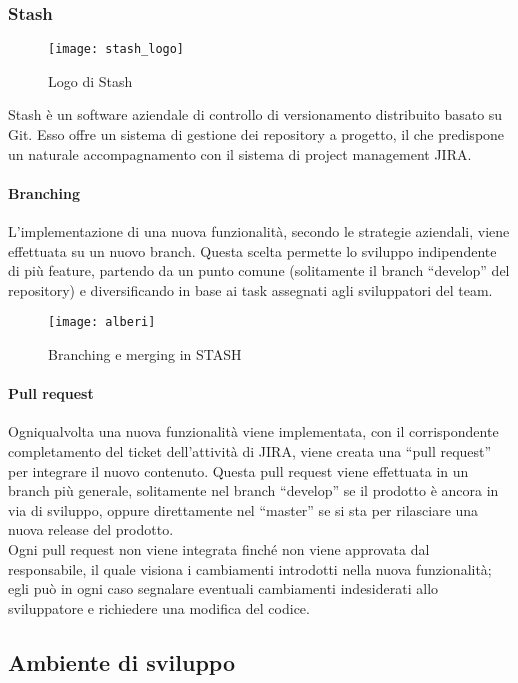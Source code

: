 \subsubsection{Stash}
\begin{figure}[htb] 
    \centering 
    \texttt{[image: stash\_logo]} 
    \caption{Logo di Stash}
\end{figure}
Stash è un software aziendale di controllo di versionamento distribuito basato su Git. 
Esso offre un sistema di gestione dei repository a progetto, il che predispone un naturale accompagnamento con il sistema di project management JIRA.

\paragraph{Branching}
L’implementazione di una nuova funzionalità, secondo le strategie aziendali, viene effettuata su un nuovo branch. Questa scelta permette lo sviluppo indipendente di più feature, partendo da un punto comune (solitamente il branch “develop” del repository) e diversificando in base ai task assegnati agli sviluppatori del team.
\begin{figure}[htb] 
    \centering 
    \texttt{[image: alberi]} 
    \caption{Branching e merging in STASH}
\end{figure}

\paragraph{Pull request}
Ogniqualvolta una nuova funzionalità viene implementata, con il corrispondente completamento del ticket dell’attività di JIRA, viene creata una “pull request” per integrare il nuovo contenuto. Questa pull request viene effettuata in un branch più generale, solitamente nel branch “develop” se il prodotto è ancora in via di sviluppo, oppure direttamente nel “master” se si sta per rilasciare una nuova release del prodotto.\\
Ogni pull request non viene integrata finché non viene approvata dal responsabile, il quale visiona i cambiamenti introdotti nella nuova funzionalità; egli può in ogni caso segnalare eventuali cambiamenti indesiderati allo sviluppatore e richiedere una modifica del codice.

\subsection{Ambiente di sviluppo}

